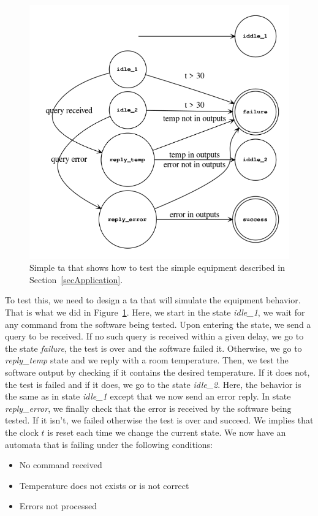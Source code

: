 \documentclass[12pt]{article}
\theoremstyle{definition}
\theoremstyle{definition}
\theoremstyle{remark}
\begin{document}
\begin{figure}
    \centering
    \includegraphics[scale=0.7]{ta_serial_equipment.png}
    \caption{Simple \gls{ta} that shows how to test the simple equipment described in Section~\ref{secApplication}.}
    \label{fig:ta_serial_equipment}
\end{figure}

To test this, we need to design a \gls{ta} that will simulate the equipment behavior. That is what we did in Figure~\ref{fig:ta_serial_equipment}. Here, we start in the state \textit{idle\_1}, we wait for any command from the software being tested. Upon entering the state, we send a query to be received. If no such query is received within a given delay, we go to the state \textit{failure}, the test is over and the software failed it. Otherwise, we go to \textit{reply\_temp} state and we reply with a room temperature. Then, we test the software output by checking if it contains the desired temperature. If it does not, the test is failed and if it does, we go to the state \textit{idle\_2}. Here, the behavior is the same as in state \textit{idle\_1} except that we now send an error reply. In state \textit{reply\_error}, we finally check that the error is received by the software being tested. If it isn't, we failed otherwise the test is over and succeed. We implies that the clock $t$ is reset each time we change the current state. We now have an automata that is failing under the following conditions:
\begin{itemize}
\item No command received
\item Temperature does not exists or is not correct
\item Errors not processed
\end{itemize}
\end{document}
